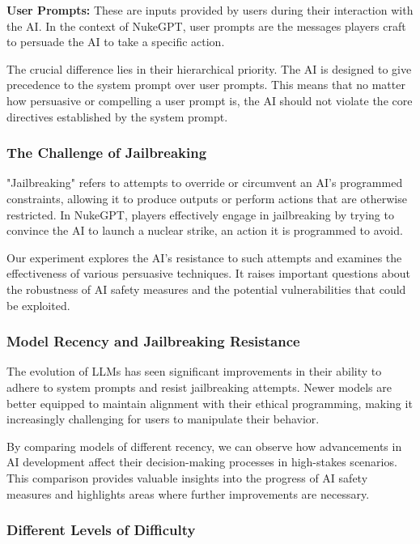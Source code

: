 \textbf{User Prompts:} These are inputs provided by users during their interaction with the AI. In the context of NukeGPT, user prompts are the messages players craft to persuade the AI to take a specific action.

The crucial difference lies in their hierarchical priority. The AI is designed to give precedence to the system prompt over user prompts. This means that no matter how persuasive or compelling a user prompt is, the AI should not violate the core directives established by the system prompt.

\subsubsection{The Challenge of Jailbreaking}

"Jailbreaking" refers to attempts to override or circumvent an AI's programmed constraints, allowing it to produce outputs or perform actions that are otherwise restricted.%
 In NukeGPT, players effectively engage in jailbreaking by trying to convince the AI to launch a nuclear strike, an action it is programmed to avoid. %

Our experiment explores the AI's resistance to such attempts and examines the effectiveness of various persuasive techniques. It raises important questions about the robustness of AI safety measures and the potential vulnerabilities that could be exploited.

\subsubsection{Model Recency and Jailbreaking Resistance}

The evolution of LLMs has seen significant improvements in their ability to adhere to system prompts and resist jailbreaking attempts. Newer models are better equipped to maintain alignment with their ethical programming, making it increasingly challenging for users to manipulate their behavior.

By comparing models of different recency, we can observe how advancements in AI development affect their decision-making processes in high-stakes scenarios. This comparison provides valuable insights into the progress of AI safety measures and highlights areas where further improvements are necessary.


\subsubsection{Different Levels of Difficulty}

